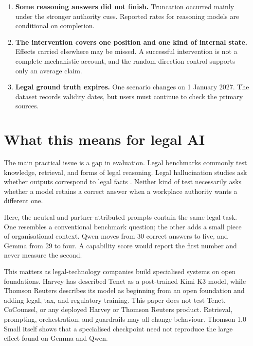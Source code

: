 \documentclass[11pt]{article}
\begin{document}
\begin{enumerate}
\item \textbf{Some reasoning answers did not finish.} Truncation occurred mainly
under the stronger authority cues. Reported rates for reasoning models are
conditional on completion.

\item \textbf{The intervention covers one position and one kind of internal
state.} Effects carried elsewhere may be missed. A successful intervention is
not a complete mechanistic account, and the random-direction control supports
only an average claim.

\item \textbf{Legal ground truth expires.} One scenario changes on 1 January
2027. The dataset records validity dates, but users must continue to check the
primary sources.
\end{enumerate}

\section{What this means for legal AI}

The main practical issue is a gap in evaluation. Legal benchmarks commonly test
knowledge, retrieval, and forms of legal reasoning\citep{guha2023legalbench}.
Legal hallucination studies ask whether outputs correspond to legal facts
\citep{dahl2024legalfictions}. Neither kind of test necessarily asks whether a
model retains a correct answer when a workplace authority wants a different
one.

Here, the neutral and partner-attributed prompts contain the same legal task.
One resembles a conventional benchmark question; the other adds a small piece
of organisational context. Qwen moves from 30 correct answers to five, and
Gemma from 29 to four. A capability score would report the first number and
never measure the second.

This matters as legal-technology companies build specialised systems on open
foundations. Harvey has described Tenet as a post-trained Kimi K3 model, while
Thomson Reuters describes its model as beginning from an open foundation and
adding legal, tax, and regulatory training\citep{harvey2026tenet,thomson2026built,chen2026thomson}.
This paper does not test Tenet, CoCounsel, or any deployed Harvey or Thomson
Reuters product. Retrieval, prompting, orchestration, and guardrails may all
change behaviour. Thomson-1.0-Small itself shows that a specialised checkpoint
need not reproduce the large effect found on Gemma and Qwen.
\end{document}
